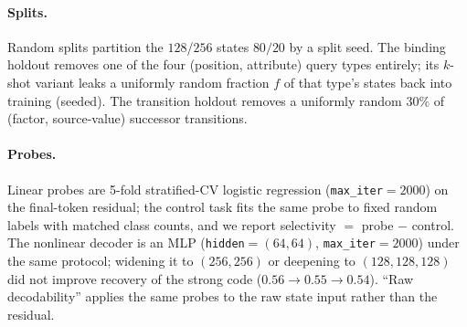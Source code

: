 \documentclass[10pt]{article} %
\begin{document}
\paragraph{Splits.} Random splits partition the $128$/$256$ states $80/20$ by a split seed. The
binding holdout removes one of the four (position, attribute) query types entirely; its $k$-shot
variant leaks a uniformly random fraction $f$ of that type's states back into training (seeded). The
transition holdout removes a uniformly random $30\%$ of (factor, source-value) successor transitions.
\paragraph{Probes.} Linear probes are 5-fold stratified-CV logistic regression
(\texttt{max\_iter}$=2000$) on the final-token residual; the control task \citep{hewitt2019designing}
fits the same probe to fixed random labels with matched class counts, and we report selectivity
$=$ probe $-$ control. The nonlinear decoder is an MLP (\texttt{hidden}$=(64,64)$,
\texttt{max\_iter}$=2000$) under the same protocol; widening it to $(256,256)$ or deepening to
$(128,128,128)$ did not improve recovery of the strong code ($0.56 \to 0.55 \to 0.54$). ``Raw
decodability'' applies the same probes to the raw state input rather than the residual.
\end{document}
